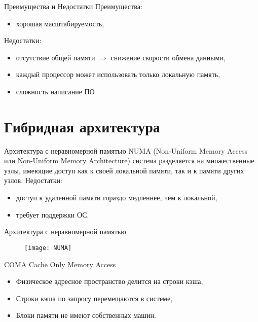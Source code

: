 \begin{frame}{Преимущества и Недостатки}
Преимущества:
\begin{itemize}
    \item хорошая масштабируемость,
\end{itemize}
\vfill
Недостатки:
\begin{itemize}
    \item отсутствие общей памяти $\Rightarrow$ снижение скорости обмена данными,
    \item каждый процессор может использовать только локальную память,
    \item сложность написание ПО
\end{itemize}
\end{frame}

\section{Гибридная архитектура}

\begin{frame}{Архитектура с неравномерной памятью}
NUMA (Non-Uniform Memory Access или Non-Uniform Memory Architecture) система разделяется на множественные узлы, имеющие доступ как к своей локальной памяти, так и к памяти других узлов.
\vfill
Недостатки:
\begin{itemize}
    \item доступ к удаленной памяти гораздо медленнее, чем к локальной,
    \item требует поддержки ОС.
\end{itemize}
\end{frame}

\begin{frame}{Архитектура с неравномерной памятью}
\begin{figure}[htpb]
    \centering
    \texttt{[image: NUMA]}
\end{figure}
\end{frame}

\begin{frame}{COMA}
\vfill
Cache Only Memory Access
\vfill
\begin{itemize}
    \item Физическое адресное пространство делится на строки кэша,
    \item Строки кэша по запросу перемещаются в системе,
    \item Блоки памяти не имеют собственных машин.
\end{itemize}
\end{frame}


